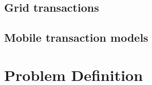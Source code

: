 \documentclass{sig-alternate-05-2015}
\begin{document}
\subsection{Grid transactions}
\label{sec:grid}

\subsection{Mobile transaction models}
\label{sec:mobile}



\section{Problem Definition}
\label{sec:modern}




\end{document}
